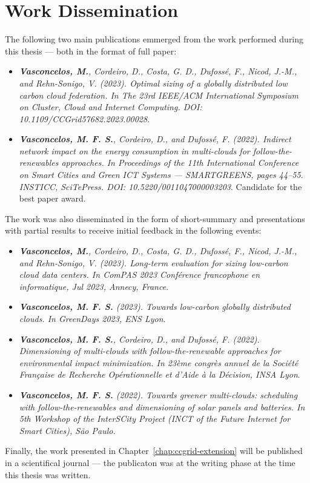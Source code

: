 \section{Work Dissemination}

\label{sec:conclusion_dissemination}

The following two main publications emmerged from the work performed during this thesis --- both in the format of full paper:

\begin{itemize}

\item  \textit{\textbf{Vasconcelos, M.}, Cordeiro, D., Costa, G. D., Dufossé, F., Nicod, J.-M., and Rehn-Sonigo, V. (2023). Optimal sizing of a globally distributed low carbon cloud federation. In The 23rd IEEE/ACM International Symposium on Cluster, Cloud and Internet Computing. DOI: 10.1109/CCGrid57682.2023.00028}.
  
\item  \textit{\textbf{Vasconcelos, M. F. S.}, Cordeiro, D., and Dufossé, F. (2022). Indirect network impact on the energy consumption in multi-clouds for follow-the-renewables approaches. In Proceedings of the 11th International Conference on Smart Cities and Green ICT Systems — SMARTGREENS, pages 44–55. INSTICC, SciTePress. DOI: 10.5220/0011047000003203}. Candidate for the best paper award.

\end{itemize}

The work was also disseminated in the form of short-summary and presentations with partial results to receive initial feedback in the following events:

\begin{itemize}

\item \textit{\textbf{Vasconcelos, M.}, Cordeiro, D., Costa, G. D., Dufossé, F., Nicod, J.-M., and Rehn-Sonigo, V. (2023). Long-term evaluation for sizing low-carbon cloud data centers. In ComPAS 2023 Conférence francophone en informatique, Jul 2023, Annecy, France}.

  \item  \textit{\textbf{Vasconcelos, M. F. S.} (2023). Towards low-carbon globally distributed clouds. In GreenDays 2023, ENS Lyon}.

\item  \textit{\textbf{Vasconcelos, M. F. S.}, Cordeiro, D., and Dufossé, F. (2022). Dimensioning of multi-clouds with follow-the-renewable approaches for environmental impact minimization. In 23ème congrès annuel de la Société Française de Recherche Opérationnelle et d’Aide à la Décision, INSA Lyon}.

\item  \textit{\textbf{Vasconcelos, M. F. S.} (2022). Towards greener multi-clouds: scheduling with follow-the-renewables and dimensioning of solar panels and batteries. In 5th Workshop of the InterSCity Project (INCT of the Future Internet for Smart Cities), São Paulo.}

\end{itemize}

Finally, the work presented in Chapter~\ref{chap:ccgrid-extension} will be published in a scientifical journal --- the publicaton was at the writing phase at the time this thesis was written.